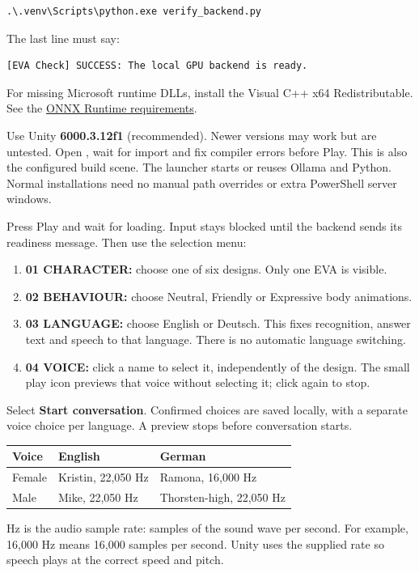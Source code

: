 \begin{lstlisting}[caption={Run the setup check},label={code:check}]
.\.venv\Scripts\python.exe verify_backend.py
\end{lstlisting}
The last line must say:
\begin{lstlisting}
[EVA Check] SUCCESS: The local GPU backend is ready.
\end{lstlisting}
For missing Microsoft runtime DLLs, install the Visual C++ x64 Redistributable.
See the \href{https://onnxruntime.ai/docs/execution-providers/CUDA-ExecutionProvider.html}{ONNX Runtime requirements}.

Use Unity \textbf{6000.3.12f1} (recommended). Newer versions may work but are
untested. Open , wait for import and
fix compiler errors before Play. This is also the configured build scene.
The launcher starts or reuses Ollama and Python. Normal installations need no
manual path overrides or extra PowerShell server windows.

\clearpage
{}
Press Play and wait for loading. Input stays blocked until the backend sends
its readiness message. Then use the selection menu:
\begin{enumerate}[itemsep=1pt,topsep=2pt]
\item \textbf{01 CHARACTER:} choose one of six designs. Only one EVA is visible.
\item \textbf{02 BEHAVIOUR:} choose Neutral, Friendly or Expressive body animations.
\item \textbf{03 LANGUAGE:} choose English or Deutsch. This fixes recognition,
answer text and speech to that language. There is no automatic language switching.
\item \textbf{04 VOICE:} click a name to select it, independently of the design.
The small play icon previews that voice without selecting it; click again to stop.
\end{enumerate}
Select \textbf{Start conversation}. Confirmed choices are saved locally, with a
separate voice choice per language. A preview stops before conversation starts.

\begin{tabularx}{\linewidth}{@{}P{27mm}Y Y@{}}
\toprule
Voice & English & German\\
\midrule
Female & Kristin, 22,050 Hz & Ramona, 16,000 Hz\\
Male & Mike, 22,050 Hz & Thorsten-high, 22,050 Hz\\
\bottomrule
\end{tabularx}
Hz is the audio sample rate: samples of the sound wave per second. For example,
16,000 Hz means 16,000 samples per second. Unity uses the supplied rate so speech
plays at the correct speed and pitch.

